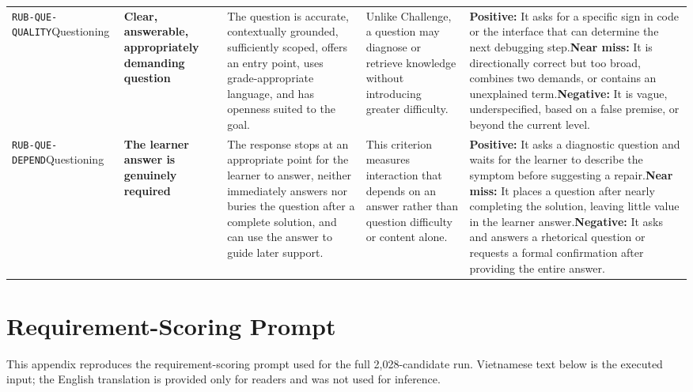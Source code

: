 \documentclass[conference]{IEEEtran}
\begin{document}
\begin{longtable}{P{0.14\textwidth}P{0.17\textwidth}P{0.20\textwidth}P{0.17\textwidth}P{0.24\textwidth}}
\texttt{RUB-QUE-QUALITY}\newline{}Questioning & \textbf{Clear, answerable, appropriately demanding question} & The question is accurate, contextually grounded, sufficiently scoped, offers an entry point, uses grade-appropriate language, and has openness suited to the goal. & Unlike Challenge, a question may diagnose or retrieve knowledge without introducing greater difficulty. & \textbf{Positive:} It asks for a specific sign in code or the interface that can determine the next debugging step.\newline\textbf{Near miss:} It is directionally correct but too broad, combines two demands, or contains an unexplained term.\newline\textbf{Negative:} It is vague, underspecified, based on a false premise, or beyond the current level. \\
\texttt{RUB-QUE-DEPEND}\newline{}Questioning & \textbf{The learner answer is genuinely required} & The response stops at an appropriate point for the learner to answer, neither immediately answers nor buries the question after a complete solution, and can use the answer to guide later support. & This criterion measures interaction that depends on an answer rather than question difficulty or content alone. & \textbf{Positive:} It asks a diagnostic question and waits for the learner to describe the symptom before suggesting a repair.\newline\textbf{Near miss:} It places a question after nearly completing the solution, leaving little value in the learner answer.\newline\textbf{Negative:} It asks and answers a rhetorical question or requests a formal confirmation after providing the entire answer. \\
\end{longtable}
\endgroup
\clearpage
\twocolumn
\section{Requirement-Scoring Prompt}
\label{app:requirement-prompt}

This appendix reproduces the requirement-scoring prompt used for the
full 2,028-candidate run. Vietnamese text below is the executed input; the
English translation is provided only for readers and was not used for
inference.
\end{document}
